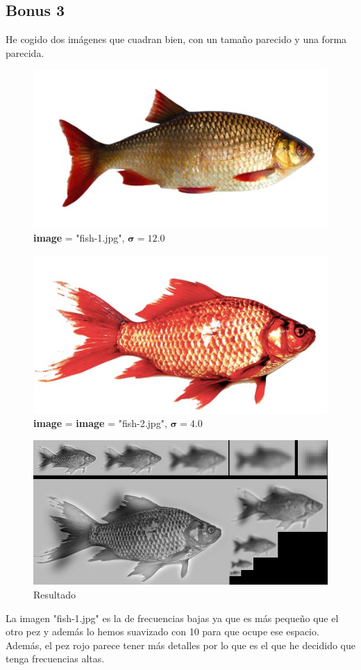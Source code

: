 \documentclass{article}
\begin{document}
\subsection{Bonus 3}
He cogido dos imágenes que cuadran bien, con un tamaño parecido y una forma parecida.
\begin{figure}[hbt!]
	\centering
	\includegraphics[width=.9\textwidth]{assets/ex1-A/fish-1.jpg}
	\caption{\textbf{image} = "fish-1.jpg", $\boldsymbol{\sigma} = 12.0$}
\end{figure}
\begin{figure}[hbt!]
	\centering
	\includegraphics[width=.9\textwidth]{assets/ex1-A/fish-2.jpg}
	\caption{\textbf{image} = \textbf{image} = "fish-2.jpg", $\boldsymbol{\sigma} = 4.0$}
\end{figure}
\begin{figure}[hbt!]
	\centering
	\includegraphics[width=.9\textwidth]{assets/ex1-A/fish-hibrid.png}
	\caption{Resultado}
\end{figure}
La imagen "fish-1.jpg" es la de frecuencias bajas ya que es más pequeño que el otro pez y además lo hemos suavizado con 10 para que ocupe ese espacio. Además, el pez rojo parece tener más detalles por lo que es el que he decidido que tenga frecuencias altas.
\newpage
\end{document}
